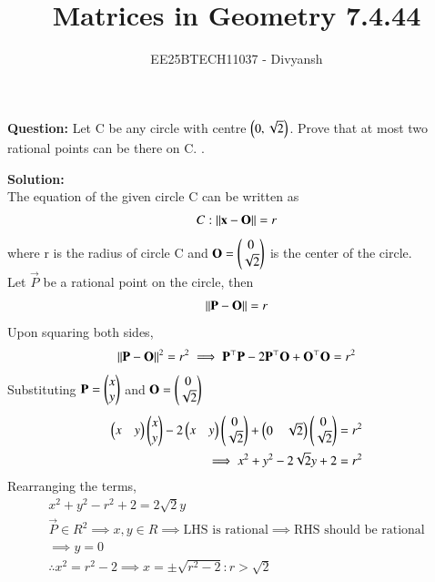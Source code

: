 \documentclass[journal,12pt,onecolumn]{IEEEtran}
\title{Matrices in Geometry 7.4.44}
\author{EE25BTECH11037 - Divyansh}
\theoremstyle{remark}
\begin{document}
\vspace{3cm}
\maketitle
{\let\newpage\relax\maketitle}
\textbf{Question: }
Let C be any circle with centre $\left(0, \sqrt{2}\right)$. Prove that at most two rational points can be there on C.  .
\vspace{2mm}


\textbf{Solution:}
\\
The equation of the given circle C can be written as 
\begin{align}
    C: \left\lVert\mathbf{x}-\mathbf{O}\right\rVert=r
\end{align}
where r is the radius of circle C and $\mathbf{O}=\begin{pmatrix}0\\\sqrt{2}\end{pmatrix}$ is the center of the circle.\\
Let $\vec{P}$ be a rational point on the circle, then
\begin{align}
    \left\lVert\mathbf{P} - \mathbf{O}\right\rVert = r
\end{align}
Upon squaring both sides,
\begin{align}
    \left\lVert\mathbf{P} - \mathbf{O}\right\rVert^2 = r^2 \implies \mathbf{P}^{\top}\mathbf{P} - 2\mathbf{P}^{\top}\mathbf{O} + \mathbf{O}^{\top}\mathbf{O} = r^2
\end{align}
Substituting $\mathbf{P}=\begin{pmatrix}x \\ y\end{pmatrix}$ and $\mathbf{O}=\begin{pmatrix}0 \\ \sqrt{2}\end{pmatrix}$
\begin{align}
    \begin{pmatrix}x & y\end{pmatrix}\begin{pmatrix}x \\ y\end{pmatrix} - 2 \begin{pmatrix}x&y\end{pmatrix}\begin{pmatrix}0 \\ \sqrt{2}\end{pmatrix} + \begin{pmatrix}0 & \sqrt{2}\end{pmatrix}\begin{pmatrix}0 \\ \sqrt{2}\end{pmatrix} = r^2\\
    \implies x^2 + y^2 - 2\sqrt{2}y + 2=r^2
\end{align}
Rearranging the terms,
\begin{align}
    x^2 + y^2 -r^2 + 2=2\sqrt{2}y\\
    \vec{P} \in R^2 \implies x, y \in R \implies \text{LHS is rational} \implies \text{RHS should be rational} \\
    \implies y=0 \\
    \therefore x^2 = r^2 -2 \implies x = \pm \sqrt{r^2 - 2}: r>\sqrt{2}
\end{align}
\end{document}
